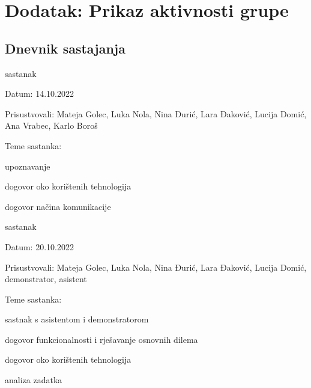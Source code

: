 \chapter*{Dodatak: Prikaz aktivnosti grupe}
		
		\section*{Dnevnik sastajanja}
		\begin{packed_enum}
			\item  sastanak
			
			\item[] \begin{packed_item}
				\item Datum: 14.10.2022 
				\item Prisustvovali: Mateja Golec, Luka Nola, Nina Đurić, Lara Đaković, Lucija Domić, Ana Vrabec, Karlo Boroš
				\item Teme sastanka: 
				\begin{packed_item}
					\item  upoznavanje
					\item  dogovor oko korištenih tehnologija
					\item  dogovor načina komunikacije
				\end{packed_item}
			\end{packed_item}
			

			\item  sastanak
			
			\item[] \begin{packed_item}
				\item Datum: 20.10.2022 
				\item Prisustvovali: Mateja Golec, Luka Nola, Nina Đurić, Lara Đaković, Lucija Domić, demonstrator, asistent
				\item Teme sastanka:
				\begin{packed_item}
					\item  sastnak s asistentom i demonstratorom
					\item  dogovor funkcionalnosti i rješavanje osnovnih dilema
					\item  dogovor oko korištenih tehnologija
					\item  analiza zadatka
				\end{packed_item}
			\end{packed_item}
			

\end{packed_enum}

